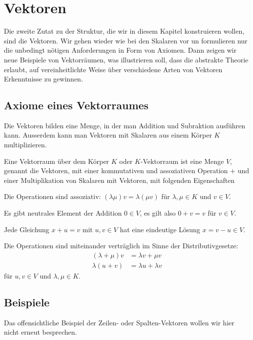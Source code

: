 %
%
%
\section{Vektoren}
Die zweite Zutat zu der Struktur, die wir in diesem Kapitel
konstruieren wollen, sind die Vektoren.
Wir gehen wieder wie bei den Skalaren vor un formulieren nur
die unbedingt nötigen Anforderungen in Form von Axiomen.
Dann zeigen wir neue Beispiele von Vektorräumen, was illustrieren soll,
dass die abstrakte Theorie erlaubt, auf vereinheitlichte Weise über
verschiedene Arten von Vektoren Erkenntnisse zu gewinnen.

\subsection{Axiome eines Vektorraumes}
Die Vektoren bilden eine Menge, in der man Addition und Subraktion 
ausführen kann.
Ausserdem kann man Vektoren mit Skalaren aus einem Körper $K$ multiplizieren.

\begin{definition}
Eine Vektorraum über dem Körper $K$ oder $K$-Vektorraum
ist eine Menge $V$, genannt die Vektoren,
mit einer kommutativen und assoziativen Operation $+$ und einer Multiplikation
von Skalaren mit Vektoren, mit folgenden Eigenschaften
\begin{compactenum}
\item Die Operationen sind assoziativ: $(\lambda\mu)v=\lambda(\mu v)$ für
$\lambda,\mu\in K$ und $v\in V$.
\item Es gibt neutrales Element der Addition $0\in V$, es gilt also
$0+v=v$ für $v\in V$.
\item Jede Gleichung $x+u=v$ mit $u,v\in V$ hat eine eindeutige Lösung
$x=v-u\in V$.
\item Die Operationen sind miteinander verträglich im Sinne der 
Distributivgesetze:
\begin{align*}
(\lambda + \mu)v&=\lambda v + \mu v
\\
\lambda(u+v)&=\lambda u + \lambda v
\end{align*}
für $u,v\in V$ und $\lambda,\mu\in K$.
\end{compactenum}
\end{definition}

\subsection{Beispiele}
Das offensichtliche Beispiel der Zeilen- oder Spalten-Vektoren wollen wir
hier nicht erneut besprechen.

